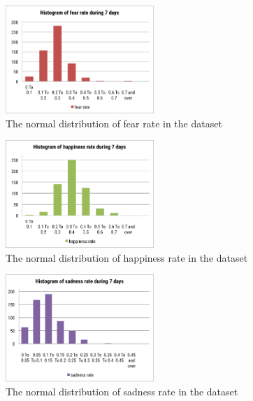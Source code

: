 \begin{figure}[htb!] 
\centering    
\includegraphics[width=0.5\textwidth]{HistogramFearWeek}
\caption{The normal distribution of fear rate in the dataset}
\label{fig:histogramFearWeek}
\end{figure}

\begin{figure}[htb!] 
\centering    
\includegraphics[width=0.5\textwidth]{HistogramHappinessWeek}
\caption{The normal distribution of happiness rate in the dataset}
\label{fig:histogramHappinessWeek}
\end{figure}

\begin{figure}[htb!] 
\centering    
\includegraphics[width=0.5\textwidth]{HistogramSadnessWeek}
\caption{The normal distribution of sadness rate in the dataset}
\label{fig:histogramSadnessWeek}
\end{figure}

